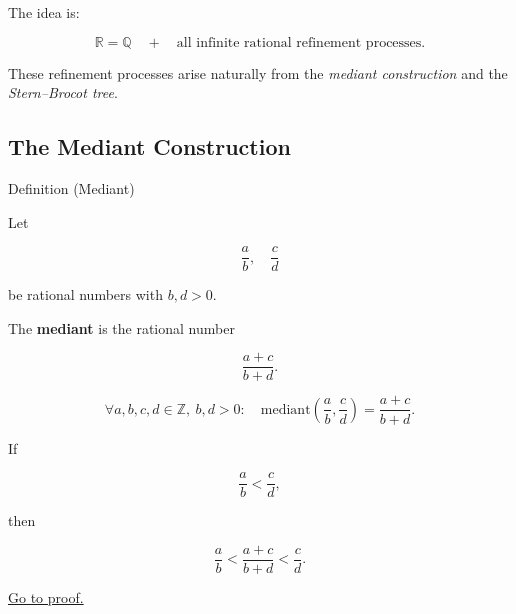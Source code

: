 \begin{exposition}
The idea is:
\end{exposition}

\begin{exposition}
\[
\mathbb{R}
=
\mathbb{Q}
\quad+\quad
\text{all infinite rational refinement processes}.
\]
\end{exposition}

\begin{exposition}
These refinement processes arise naturally from the
\emph{mediant construction} and the \emph{Stern–Brocot tree}.
\end{exposition}

\begin{exposition}
\bigskip
\end{exposition}

\subsection*{The Mediant Construction}

\begin{definitionbox}{Definition (Mediant)}

Let

\[
\frac{a}{b},\quad \frac{c}{d}
\]

be rational numbers with $b,d>0$.

The \textbf{mediant} is the rational number

\[
\frac{a+c}{b+d}.
\]

\end{definitionbox}

\begin{remark*}

\[
\forall a,b,c,d\in\mathbb{Z},\ b,d>0:
\quad
\text{mediant}\!\left(\frac{a}{b},\frac{c}{d}\right)
=
\frac{a+c}{b+d}.
\]

\end{remark*}

\begin{proposition}
\label{prop:stern-brocot-mediant-inequality}

If

\[
\frac{a}{b} < \frac{c}{d},
\]

then

\[
\frac{a}{b}
<
\frac{a+c}{b+d}
<
\frac{c}{d}.
\]

\hyperref[prf:stern-brocot-mediant-inequality]{Go to proof.}
\end{proposition}

